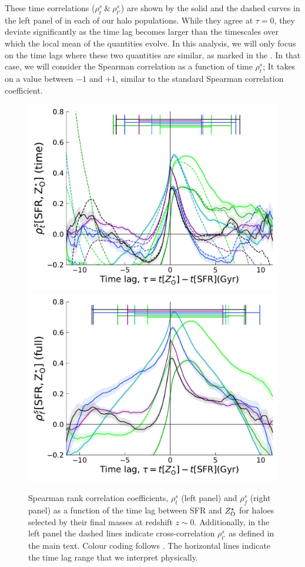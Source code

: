 These time correlations ($\rho^s_t ~\&~ \rho^s_{t'}$) are shown by the solid and the dashed curves in the left panel of  in each of our halo populations. While they agree at $\tau=0$, they deviate significantly as the time lag becomes larger than the timescales over which the local mean of the quantities evolve. In this analysis, we will only focus on the time lags where these two quantities are similar, as marked in the . In that case, we will consider the Spearman correlation as a function of time $\rho^s_t$; It takes on a value between $-1$ and $+1$, similar to the standard Spearman correlation coefficient. 
\begin{figure}[htbp]
\centering
\includegraphics[width=.49\linewidth]{plots/dynam_relxn/Spea_correl_vs_shift_betw_SFR-Z(O)_SFreg_timecorr.pdf}
\includegraphics[width=.49\linewidth]{plots/dynam_relxn/Spea_correl_vs_shift_betw_SFR-Z(O)_SFreg_fullcorr.pdf}
\caption{Spearman rank correlation coefficients, $\rho^s_t$ (left panel) and $\rho^s_f$ (right panel) as a function of the time lag between SFR and $Z^{\star}_{\rm{O}}$ for haloes selected by their final masses at redshift $z\sim 0$. Additionally, in the left panel the dashed lines indicate cross-correlation $\rho^s_{t'}$ as defined in the main text. Colour coding follows . The horizontal lines indicate the time lag range that we interpret physically.}
\label{fig:dynam-correl-sfr-ZOsfr-timeshift-func-all}
\end{figure}

